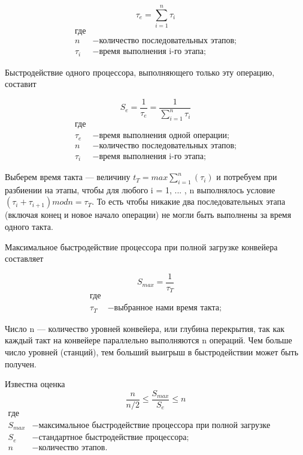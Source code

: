 \begin{equation}\label{form:way}
 \tau _{e}={\sum\limits_{i=1}^n \tau _{i}}
 \end{equation}
 \begin{align*}
    \text{где} \\
    n &- \text{количество последовательных этапов;} \\
   \tau _{i} &- \text{время выполнения i-го этапа;}
\end{align*}

Быстродействие одного процессора, выполняющего только эту операцию, составит

\begin{equation}\label{form:way}
 S_{e}={\frac{1}{\tau _{e}}}={\frac{1}{\sum\limits_{i=1}^n \tau _{i}}}
 \end{equation}
 \begin{align*}
    \text{где} \\
    \tau _{e} &- \text{время выполнения одной операции;} \\
    n &- \text{количество последовательных этапов;} \\
   \tau _{i} &- \text{время выполнения i-го этапа;}
\end{align*}

Выберем время такта — величину $t _{T} = max{\sum\limits_{i=1}^n(\tau_{i})}$ и потребуем при разбиении на этапы, чтобы для любого i = 1, ... , n выполнялось условие $(\tau_{i} + \tau_{i+1}) mod n = \tau_{T}$. То есть чтобы никакие два последовательных этапа (включая конец и новое начало операции) не могли быть выполнены за время одного такта.

Максимальное быстродействие процессора при полной загрузке конвейера составляет

\begin{equation}\label{form:way}
 S_{max}={\frac{1}{\tau _{T}}}
 \end{equation}
 \begin{align*}
    \text{где} \\
    \tau _{T} &- \text{выбранное нами время такта;}
\end{align*}

Число n — количество уровней конвейера, или глубина перекрытия, так как каждый такт на конвейере параллельно выполняются n операций. Чем больше число уровней (станций), тем больший выигрыш в быстродействии может быть получен.

Известна оценка
\begin{equation}\label{form:way}
{\frac{n}{n/2} \leq {\frac{S_{max}}{S_{e}}} \leq n}
 \end{equation}
 \begin{align*}
    \text{где} \\
    S_{max} &- \text{максимальное быстродействие процессора  при полной загрузке конвейера;} \\
    S_{e} &- \text{стандартное быстродействие процессора;} \\
   n &- \text{количество этапов.}
\end{align*}

